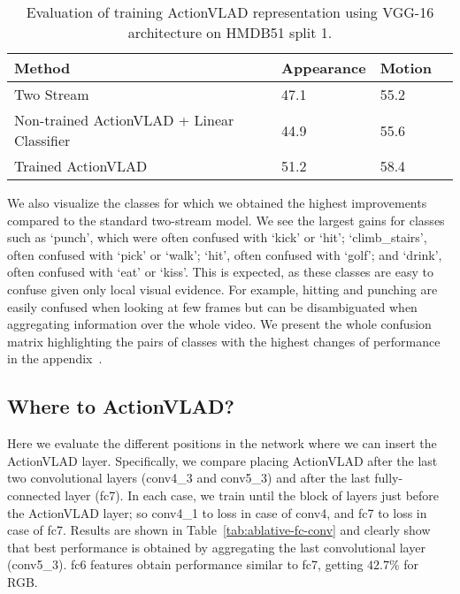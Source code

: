 \documentclass[10pt,twocolumn,letterpaper]{article}
\newcommand{\methodTag}[0]{ActionVLAD}
\newcommand{\tableSize}[0]{\scriptsize}
\begin{document}
\begin{table}[]
\caption{Evaluation of training \methodTag{} representation
using VGG-16 architecture on HMDB51 split 1.}
\label{tab:train_thru_netvlad}
\tableSize{}
\centering
\begin{tabular}{llll}
\toprule
Method    & Appearance  & Motion      &  \\
\midrule
Two Stream~\cite{Feichtenhofer_16} & 47.1 & 55.2 \\
Non-trained \methodTag{} + Linear Classifier & 44.9 & 55.6 \\
Trained \methodTag{} & 51.2 & 58.4 \\
\bottomrule
\end{tabular}
\end{table}


We also visualize the classes for which we obtained the highest improvements compared to the standard two-stream model.
We see the largest gains for classes such as `punch', which
were often confused with `kick' or `hit';
`climb\_stairs', often confused with `pick' or `walk';
`hit', often confused with `golf'; and `drink', 
often confused with `eat' or `kiss'. This is expected,
as these classes are easy to confuse given only local visual evidence.
For example, hitting and punching are easily confused when looking at few frames but can be disambiguated when aggregating information over the whole video. We present the whole confusion matrix highlighting the pairs of classes with the highest changes of performance in the appendix~\cite{appendix}.




\subsection{Where to \methodTag{}?}\label{sec:expts:whereNetVLAD}

Here we evaluate the different positions in the network where we
can insert the \methodTag{} layer. Specifically, we compare placing \methodTag{}  after the last two 
convolutional layers (conv4\_3 and conv5\_3) and after the last fully-connected layer (fc7). In each case, we train until the block of layers just before
the \methodTag{} layer; so conv4\_1 to loss in case of conv4, and 
fc7 to loss in case of fc7.
Results are shown in Table~\ref{tab:ablative-fc-conv} and clearly show that best performance is obtained by aggregating the last convolutional layer (conv5\_3). fc6 features obtain performance similar to fc7,
getting $42.7\%$ for RGB.
\end{document}
